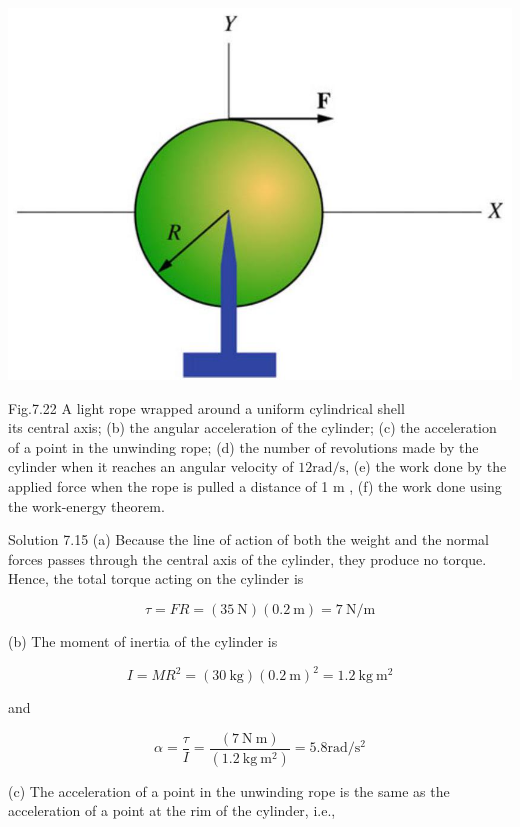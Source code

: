 \documentclass[10pt]{article}
\begin{document}
\begin{center}
\includegraphics[max width=\textwidth]{2024_09_13_db1f357d2aad0a03eb2eg-123}
\end{center}

Fig.7.22 A light rope wrapped around a uniform cylindrical shell\\
its central axis; (b) the angular acceleration of the cylinder; (c) the acceleration of a point in the unwinding rope; (d) the number of revolutions made by the cylinder when it reaches an angular velocity of $12 \mathrm{rad} / \mathrm{s}$, (e) the work done by the applied force when the rope is pulled a distance of 1 m , (f) the work done using the work-energy theorem.

Solution 7.15 (a) Because the line of action of both the weight and the normal forces passes through the central axis of the cylinder, they produce no torque. Hence, the total torque acting on the cylinder is

$$
\tau=F R=(35 \mathrm{~N})(0.2 \mathrm{~m})=7 \mathrm{~N} / \mathrm{m}
$$

(b) The moment of inertia of the cylinder is

$$
I=M R^{2}=(30 \mathrm{~kg})(0.2 \mathrm{~m})^{2}=1.2 \mathrm{~kg} \mathrm{~m}^{2}
$$

and

$$
\alpha=\frac{\tau}{I}=\frac{(7 \mathrm{~N} \mathrm{~m})}{\left(1.2 \mathrm{~kg} \mathrm{~m}{ }^{2}\right)}=5.8 \mathrm{rad} / \mathrm{s}^{2}
$$

(c) The acceleration of a point in the unwinding rope is the same as the acceleration of a point at the rim of the cylinder, i.e.,
\end{document}
